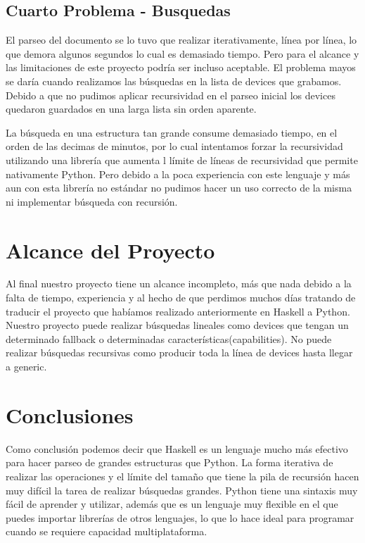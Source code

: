 \documentclass[11pt]{article} %
\begin{document}
\subsection{Cuarto Problema - Busquedas}

El parseo del documento se lo tuvo que realizar iterativamente, línea por línea, lo que demora algunos segundos lo cual es demasiado tiempo. Pero para el alcance y las limitaciones de este proyecto podría ser incluso aceptable. El problema mayos se daría cuando realizamos las búsquedas en la lista de devices que grabamos. Debido a que no pudimos aplicar recursividad en el parseo inicial los devices quedaron guardados en una larga lista sin orden aparente.

La búsqueda en una estructura tan grande consume demasiado tiempo, en el orden de las decimas de minutos, por lo cual intentamos forzar la recursividad utilizando una librería que aumenta l límite de líneas de recursividad que permite nativamente Python. Pero debido a la poca experiencia con este lenguaje y más aun con esta librería no estándar no pudimos hacer un uso correcto de la misma ni implementar búsqueda con recursión. 

\section{Alcance del Proyecto}


Al final nuestro proyecto tiene un alcance incompleto, más que nada debido a la falta de tiempo, experiencia y al hecho de que perdimos muchos días tratando de traducir el proyecto que habíamos realizado anteriormente en Haskell a Python. Nuestro proyecto puede realizar búsquedas lineales como devices que tengan un determinado fallback o determinadas características(capabilities). No puede realizar búsquedas recursivas como producir toda la línea de devices hasta llegar a generic. 



\section{Conclusiones}

Como conclusión podemos decir que Haskell es un lenguaje mucho más efectivo para hacer parseo de grandes estructuras que Python. La forma iterativa de realizar las operaciones y el límite del tamaño que tiene la pila de recursión hacen muy difícil la tarea de realizar búsquedas grandes.
Python tiene una sintaxis muy fácil de aprender y utilizar, además que es un lenguaje muy flexible en el que puedes importar librerías de otros lenguajes, lo que lo hace ideal para programar cuando se requiere capacidad multiplataforma.













  
\end{document}
